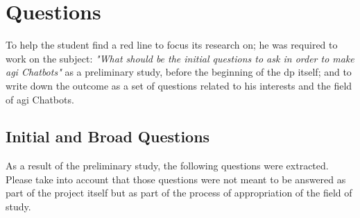 \chapter{Questions}
\label{chap:questions}

To help the student find a red line to focus its research on; he was required to work on the subject: \textit{"What should be the initial questions to ask in order to make \gls{agi} Chatbots"} as a preliminary study, before the beginning of the \gls{dp} itself; and to write down the outcome as a set of questions related to his interests and the field of \gls{agi} Chatbots.

\section{Initial and Broad Questions}
As a result of the preliminary study, the following questions were extracted. Please take into account that those questions were not meant to be answered as part of the project itself but as part of the process of appropriation of the field of study.

